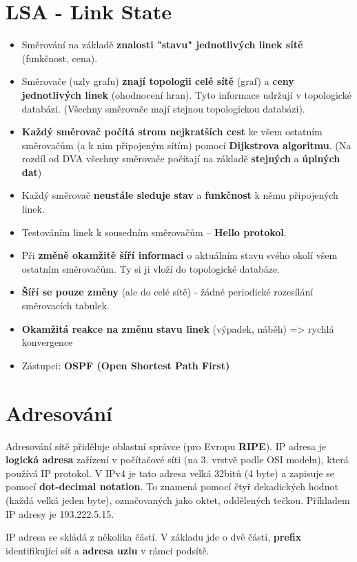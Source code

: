 \section{LSA - Link State}
\begin{itemize}
    \item Směrování na základě \textbf{znalosti "stavu" jednotlivých linek sítě} (funkčnost, cena).
    \item Směrovače (uzly grafu) \textbf{znají topologii celé sítě }(graf) a \textbf{ceny jednotlivých linek} (ohodnocení hran). Tyto informace udržují v topologické databázi. (Všechny směrovače mají stejnou topologickou databázi).
    \item \textbf{Každý směrovač počítá strom nejkratších cest} ke všem ostatním směrovačům (a k nim připojeným sítím) pomocí \textbf{Dijkstrova algoritmu}. (Na rozdíl od DVA všechny směrovače počítají na základě \textbf{stejných} a\textbf{ úplných dat})
    \item Každý směrovač\textbf{ neustále sleduje stav} a \textbf{funkčnost} k němu připojených linek.
    \item Testováním linek k sousedním směrovačům – \textbf{Hello protokol}.
    \item Při \textbf{změně okamžitě šíří informaci} o aktuálním stavu svého okolí všem ostatním směrovačům. Ty si ji vloží do topologické databáze.
    \item \textbf{Šíří se pouze změny} (ale do celé sítě) - žádné periodické rozesílání směrovacích tabulek.
    \item \textbf{Okamžitá reakce na změnu stavu linek} (výpadek, náběh) => rychlá konvergence
    \item Zástupci: \textbf{OSPF (Open Shortest Path First)}
\end{itemize}

\section{Adresování}
Adresování sítě přiděluje oblastní správce (pro Evropu \textbf{RIPE}). IP adresa je \textbf{logická adresa} zařízení v počítačové síti (na 3. vrstvě podle OSI modelu), která používá IP protokol. V IPv4 je tato adresa velká 32bitů (4 byte) a zapisuje se pomocí \textbf{dot-decimal notation}. To znamená pomocí čtyř dekadických hodnot (každá velká jeden byte), označovaných jako oktet, oddělených tečkou. Příkladem IP adresy je 193.222.5.15.

IP adresa se skládá z několika částí. V základu jde o dvě části, \textbf{prefix} identifikující síť a \textbf{adresa uzlu} v rámci podsítě.

